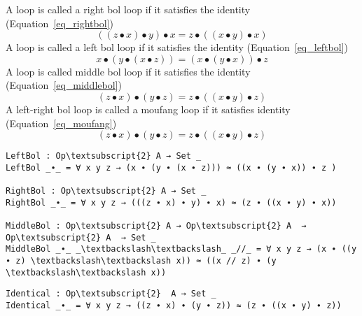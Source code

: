 A loop is called a right bol loop if it satisfies the identity  (Equation~\ref{eq_rightbol})
\begin{equation}\label{eq_rightbol}
 ((z ∙ x) ∙ y) ∙ x = z ∙ ((x ∙ y) ∙ x)
\end{equation}
A loop is called a left bol loop if it satisfies the identity (Equation~\ref{eq_leftbol})
\begin{equation}\label{eq_leftbol}
 x ∙ (y ∙ (x ∙ z)) = (x ∙ (y ∙ x)) ∙ z
\end{equation}
A loop is called middle bol loop if it satisfies the identity (Equation~\ref{eq_middlebol}) 
\begin{equation}\label{eq_middlebol}
(z ∙ x) ∙ (y ∙ z) = z ∙ ((x ∙ y) ∙ z)
\end{equation}
A left-right bol loop is called a moufang loop if it satisfies identity (Equation~\ref{eq_moufang})
\begin{equation}\label{eq_moufang}
(z ∙ x) ∙ (y ∙ z) = z ∙ ((x ∙ y) ∙ z)
\end{equation} 
\begin{center}
\begin{Verbatim}[commandchars=\\\{\},samepage=true]
LeftBol : Op\textsubscript{2} A → Set _
LeftBol _∙_ = ∀ x y z → (x ∙ (y ∙ (x ∙ z))) ≈ ((x ∙ (y ∙ x)) ∙ z )

RightBol : Op\textsubscript{2} A → Set _
RightBol _∙_ = ∀ x y z → (((z ∙ x) ∙ y) ∙ x) ≈ (z ∙ ((x ∙ y) ∙ x))

MiddleBol : Op\textsubscript{2} A → Op\textsubscript{2} A  → Op\textsubscript{2} A  → Set _
MiddleBol _∙_ _\textbackslash\textbackslash_ _//_ = ∀ x y z → (x ∙ ((y ∙ z) \textbackslash\textbackslash x)) ≈ ((x // z) ∙ (y \textbackslash\textbackslash x))
\end{Verbatim}
\begin{Verbatim}[commandchars=\\\{\},samepage=true]
Identical : Op\textsubscript{2}  A → Set _
Identical _∙_ = ∀ x y z → ((z ∙ x) ∙ (y ∙ z)) ≈ (z ∙ ((x ∙ y) ∙ z))
\end{Verbatim}
\end{center}
